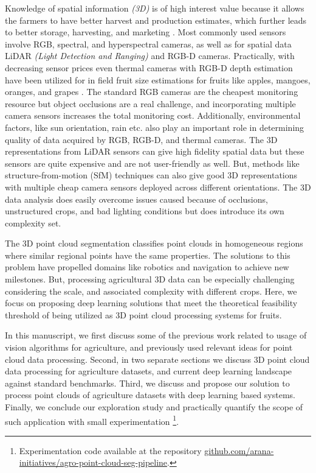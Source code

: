 \documentclass{article}
\begin{document}
Knowledge of spatial information \textit{(3D)} is of high interest value because it allows the farmers to have better harvest and production estimates, which further leads to better storage, harvesting, and marketing \cite{bargoti2017image}.
Most commonly used sensors involve RGB, spectral, and hyperspectral cameras, as well as for spatial data LiDAR \textit{(Light Detection and Ranging)} and RGB-D cameras.
Practically, with decreasing sensor prices even thermal cameras with RGB-D depth estimation have been utilized for in field fruit size estimations for fruits like apples, mangoes, oranges, and grapes \cite{stajnko2004estimation}. 
The standard RGB cameras are the cheapest monitoring resource but object occlusions are a real challenge, and incorporating multiple camera sensors increases the total monitoring cost.
Additionally, environmental factors, like sun orientation, rain etc. also play an important role in determining quality of data acquired by RGB, RGB-D, and thermal cameras.
The 3D representations from LiDAR sensors can give high fidelity spatial data but these sensors are quite expensive and are not user-friendly as well.
But, methods like structure-from-motion (SfM) techniques can also give good 3D representations with multiple cheap camera sensors deployed across different orientations.
The 3D data analysis does easily overcome issues caused because of occlusions, unstructured crops, and bad lighting conditions but does introduce its own complexity set. 


The 3D point cloud segmentation classifies point clouds in homogeneous regions where similar regional points have the same properties.
The solutions to this problem have propelled domains like robotics and navigation to achieve new milestones.
But, processing agricultural 3D data can be especially challenging considering the scale, and associated complexity with different crops.
Here, we focus on proposing deep learning solutions that meet the theoretical feasibility threshold of being utilized as 3D point cloud processing systems for fruits.


In this manuscript, we first discuss some of the previous work related to usage of vision algorithms for agriculture, and previously used relevant ideas for point cloud data processing.
Second, in two separate sections we discuss 3D point cloud data processing for agriculture datasets, and current deep learning landscape against standard benchmarks.
Third, we discuss and propose our solution to process point clouds of agriculture datasets with deep learning based systems.
Finally, we conclude our exploration study and practically quantify the scope of such application with small experimentation \footnote{ Experimentation code available at the repository \href{https://github.com/arana-initiatives/agro-point-cloud-seg-pipeline}{github.com/arana-initiatives/agro-point-cloud-seg-pipeline}.}.
\end{document}
